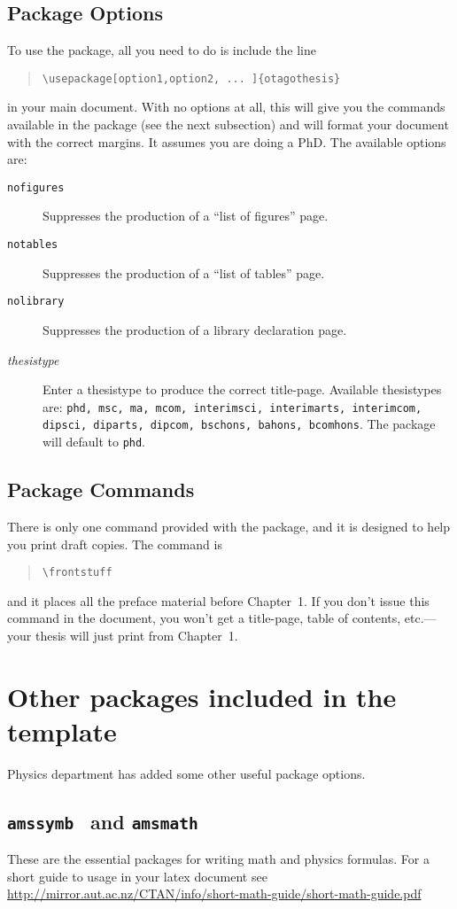 \subsection{Package Options}
To use the package, all you need to do is include the line
\begin{quote}
\verb|\usepackage[option1,option2, ... ]{otagothesis}|
\end{quote}
in your main document.  With no options at all, this will give you
the commands available in the package (see the next subsection) and
will format your document with the correct margins.  It assumes you
are doing a PhD.
The available options are:
\begin{description}
\item[{\tt nofigures}] Suppresses the production of a ``list of figures''
page.
\item[{\tt notables}] Suppresses the production of a ``list of
tables'' page.
\item[\tt nolibrary] Suppresses the production of a library
  declaration page.
\item[{\em thesistype}] Enter a thesistype to produce the correct
title-page.  Available thesistypes are: {\tt phd, msc, ma, mcom,
interimsci, interimarts, interimcom, dipsci, diparts, dipcom, bschons,
bahons, bcomhons}.  The package will default to {\tt phd}.
\end{description}

\subsection{Package Commands}
There is only one command provided with the package, and it is
designed to help you print draft copies.  The command is
\begin{quote}
\verb|\frontstuff|
\end{quote}
and it places all the preface material before
Chapter~1.  If you don't issue this command in the document, you won't
get a title-page, table of contents, etc.---your thesis will just
print from Chapter~1.

\section{Other packages included in the template}
Physics department has added some other useful package options.

\subsection{{\tt amssymb } and {\tt amsmath}}
These are the essential packages for writing math and physics formulas. 
For a short guide to usage in your latex document see 
\url{http://mirror.aut.ac.nz/CTAN/info/short-math-guide/short-math-guide.pdf}

